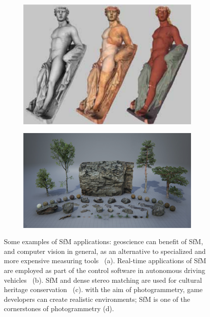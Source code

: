 \begin{figure}[h]
\begin{subfigure}{0.4\linewidth}
\includegraphics[width=\linewidth]{img/application_heritage.png}
\caption{}
\end{subfigure}
%
\begin{subfigure}{0.4\linewidth}
\centering
\includegraphics[width=\linewidth]{img/application_games.png}
\caption{}
\end{subfigure}
\caption{Some examples of SfM applications: geoscience can benefit of SfM, and computer vision in general, as
an alternative to specialized and more expensive measuring
tools~\cite{james2012straightforward} (a).
Real-time applications of SfM are employed as part of the control
software in autonomous driving vehicles~\cite{nister2004visual} (b).
SfM and dense stereo matching are used for cultural heritage
conservation~\cite{scopigno20113d} (c).
with the aim of photogrammetry, game developers can create realistic
environments; SfM is one of the cornerstones of photogrammetry (d).}
\end{figure}

